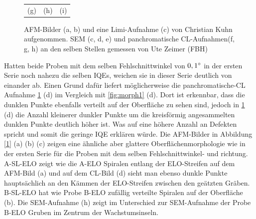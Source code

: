 \begin{figure}[H]
\begin{tabular}{ccc}
(g)  & (h) & (i)   \\[6pt]
\end{tabular}
\caption{AFM-Bilder (a, b) und eine Limi-Aufnahme (c) von Christian Kuhn aufgenommen. SEM (c, d, e) und panchromatische CL-Aufnahmen(f, g, h) an den selben Stellen gemessen von Ute Zeimer (FBH)}
\label{fig:morph2}
\end{figure}
\noindent 
Hatten beide Proben mit dem selben Fehlschnittwinkel von $0,1 \degree$ in der ersten Serie noch nahezu die selben IQEs, weichen sie in dieser Serie deutlich von einander ab. Einen Grund dafür liefert möglicherweise die panchromatische-CL Aufnahme \ref{fig:morph2} (d) im Vergleich mit \ref{fig:morph1} (d). Dort ist erkennbar, dass die dunklen Punkte ebenfalls verteilt auf der Oberfläche zu sehen sind, jedoch in \ref{fig:morph2} (d) die Anzahl kleinerer dunkler Punkte um die kreisförmig angesammelten dunklen Punkte deutlich höher ist. Was auf eine höhere Anzahl an Defekten spricht und somit die geringe IQE erklären würde. Die AFM-Bilder in Abbildung [\ref{fig:morph2}] (a) (b) (c) zeigen eine ähnliche aber glattere Oberflächenmorphologie wie in der ersten Serie für die Proben mit dem selben Fehlschnittwinkel- und richtung. A-SL-ELO zeigt wie die A-ELO Spiralen entlang der ELO-Streifen auf dem AFM-Bild (a) und auf dem CL-Bild (d) sieht man ebenso dunkle Punkte hauptsächlich an den Kämmen der ELO-Streifen zwischen den geätzten Gräben. B-SL-ELO hat wie Probe B-ELO zufällig verteilte Spiralen auf der Oberfläche (b). Die SEM-Aufnahme (h) zeigt im Unterschied zur SEM-Aufnahme der Probe B-ELO Gruben im Zentrum der Wachstumsinseln. 
